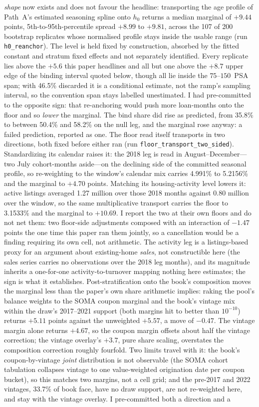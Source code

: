 \documentclass[12pt]{article}
\begin{document}
\emph{shape} now exists and does not favour the headline: transporting the age profile of Path~A's estimated seasoning spline onto $h_0$ returns a median marginal of $+9.44$ points, 5th-to-95th-percentile spread $+8.99$ to $+9.81$, across the 107 of 200 bootstrap replicates whose normalised profile stays inside the usable range (run \texttt{h0\_reanchor}). The level is held fixed by construction, absorbed by the fitted constant and stratum fixed effects and not separately identified. Every replicate lies above the $+5.6$ this paper headlines and all but one above the $+8.7$ upper edge of the binding interval quoted below, though all lie inside the $75$--$150$~PSA span; with 46.5\% discarded it is a conditional estimate, not the ramp's sampling interval, so the convention span stays labelled unestimated. I had pre-committed to the opposite sign: that re-anchoring would push more loan-months onto the floor and so \emph{lower} the marginal. The bind share did rise as predicted, from 35.8\% to between 50.4\% and 58.2\% on the null leg, and the marginal rose anyway: a failed prediction, reported as one. The floor read itself transports in two directions, both fixed before either ran (run \texttt{floor\_transport\_two\_sided}). Standardizing its calendar raises it: the 2018 leg is read in August--December---two July cohort-months aside---on the declining side of the committed seasonal profile, so re-weighting to the window's calendar mix carries 4.991\% to 5.2156\% and the marginal to $+4.70$ points. Matching its housing-activity level lowers it: active listings averaged 1.27 million over those 2018 months against 0.80 million over the window, so the same multiplicative transport carries the floor to 3.1533\% and the marginal to $+10.69$. I report the two at their own floors and do not net them: two floor-side adjustments composed with an interaction of $-1.47$ points the one time this paper ran them jointly, so a cancellation would be a finding requiring its own cell, not arithmetic. The activity leg is a listings-based proxy for an argument about existing-home \emph{sales}, not constructible here (the sales series carries no observations over the 2018 leg months), and its magnitude inherits a one-for-one activity-to-turnover mapping nothing here estimates; the sign is what it establishes. Post-stratification onto the book's composition moves the marginal less than the paper's own share arithmetic implies: raking the pool's balance weights to the SOMA coupon marginal and the book's vintage mix within the draw's 2017--2021 support (both margins hit to better than $10^{-10}$) returns $+5.11$ points against the unweighted $+5.57$, a move of $-0.47$. The vintage margin alone returns $+4.67$, so the coupon margin offsets about half the vintage correction; the vintage overlay's $+3.7$, pure share scaling, overstates the composition correction roughly fourfold. Two limits travel with it: the book's coupon-by-vintage \emph{joint} distribution is not observable (the SOMA cohort tabulation collapses vintage to one value-weighted origination date per coupon bucket), so this matches two margins, not a cell grid; and the pre-2017 and 2022 vintages, 33.7\% of book face, have no draw support, are not re-weighted here, and stay with the vintage overlay. I pre-committed both a direction and a 
\end{document}
